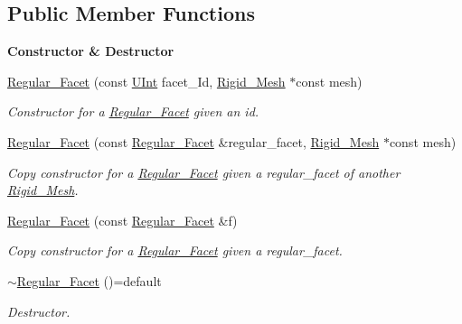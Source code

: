 \subsection*{Public Member Functions}
\begin{Indent}{\bf Constructor \& Destructor}\par
\begin{DoxyCompactItemize}
\item 
\hyperlink{classFVCode3D_1_1Rigid__Mesh_1_1Regular__Facet_ab1f9fb9622908af6bb40bf7381817ff4}{Regular\+\_\+\+Facet} (const \hyperlink{namespaceFVCode3D_a4bf7e328c75d0fd504050d040ebe9eda}{U\+Int} facet\+\_\+\+Id, \hyperlink{classFVCode3D_1_1Rigid__Mesh}{Rigid\+\_\+\+Mesh} $\ast$const mesh)
\begin{DoxyCompactList}\small\item\em Constructor for a \hyperlink{classFVCode3D_1_1Rigid__Mesh_1_1Regular__Facet}{Regular\+\_\+\+Facet} given an id. \end{DoxyCompactList}\item 
\hyperlink{classFVCode3D_1_1Rigid__Mesh_1_1Regular__Facet_ab7fc5ceae08d734865a45b95832f0eb7}{Regular\+\_\+\+Facet} (const \hyperlink{classFVCode3D_1_1Rigid__Mesh_1_1Regular__Facet}{Regular\+\_\+\+Facet} \&regular\+\_\+facet, \hyperlink{classFVCode3D_1_1Rigid__Mesh}{Rigid\+\_\+\+Mesh} $\ast$const mesh)
\begin{DoxyCompactList}\small\item\em Copy constructor for a \hyperlink{classFVCode3D_1_1Rigid__Mesh_1_1Regular__Facet}{Regular\+\_\+\+Facet} given a regular\+\_\+facet of another \hyperlink{classFVCode3D_1_1Rigid__Mesh}{Rigid\+\_\+\+Mesh}. \end{DoxyCompactList}\item 
\hyperlink{classFVCode3D_1_1Rigid__Mesh_1_1Regular__Facet_a68564026197f005cbd8a451f079df741}{Regular\+\_\+\+Facet} (const \hyperlink{classFVCode3D_1_1Rigid__Mesh_1_1Regular__Facet}{Regular\+\_\+\+Facet} \&f)
\begin{DoxyCompactList}\small\item\em Copy constructor for a \hyperlink{classFVCode3D_1_1Rigid__Mesh_1_1Regular__Facet}{Regular\+\_\+\+Facet} given a regular\+\_\+facet. \end{DoxyCompactList}\item 
\hyperlink{classFVCode3D_1_1Rigid__Mesh_1_1Regular__Facet_a78bbfe7cb8579a396b59af2289be37ce}{$\sim$\+Regular\+\_\+\+Facet} ()=default
\begin{DoxyCompactList}\small\item\em Destructor. \end{DoxyCompactList}\end{DoxyCompactItemize}
\end{Indent}
